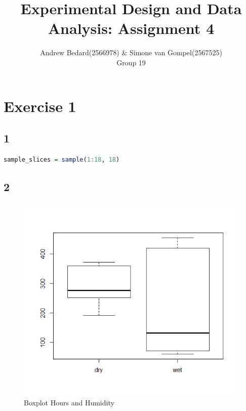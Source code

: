 \documentclass{article}
\title{Experimental Design and Data Analysis: Assignment 4}
\author{Andrew Bedard(2566978) \& Simone van Gompel(2567525) \\ Group 19}
\begin{document}
  \maketitle

  \section*{Exercise 1}
    \subsection*{1}
      \begin{lstlisting}[language=R]
      sample_slices = sample(1:18, 18)
      \end{lstlisting}
    
    \subsection*{2}
      \begin{figure}
        \includegraphics[scale=0.6]{../results/BoxHoursHum.png}
        \caption{Boxplot Hours and Humidity}
        \label{fig:BoxHoursHum}
      \end{figure}
\end{document}
